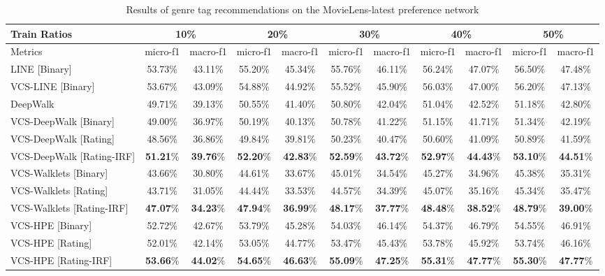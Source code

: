 {\begin{table*}%
\centering
\begin{tabular}{lcccccccccc}
\toprule
Train Ratios & \multicolumn{2}{c}{10\%} & \multicolumn{2}{c}{20\%} & \multicolumn{2}{c}{30\%} & \multicolumn{2}{c}{40\%} & \multicolumn{2}{c}{50\%} \\
\midrule
Metrics & {\small micro-f1} & {\small macro-f1} & {\small micro-f1} & {\small macro-f1} & {\small micro-f1} & {\small macro-f1} & {\small micro-f1} & {\small macro-f1} & {\small micro-f1} & {\small macro-f1}\\
\midrule
LINE \cite{line} [Binary]   & 53.73\% & 43.11\% & 55.20\% & 45.34\% & 55.76\% & 46.11\% & 56.24\% & 47.07\% & 56.50\% & 47.48\% \\
VCS-LINE [Binary]           & 53.67\% & 43.09\% & 54.88\% & 44.92\% & 55.52\% & 45.90\% & 56.03\% & 47.00\% & 56.20\% & 47.13\% \\
\midrule
DeepWalk \cite{dw}          & 49.71\% & 39.13\% & 50.55\% & 41.40\% & 50.80\% & 42.04\% & 51.04\% & 42.52\% & 51.18\% & 42.80\% \\
VCS-DeepWalk [Binary]       & 49.00\% & 36.97\% & 50.19\% & 40.13\% & 50.78\% & 41.22\% & 51.15\% & 41.71\% & 51.34\% & 42.19\% \\
VCS-DeepWalk [Rating]       & 48.56\% & 36.86\% & 49.84\% & 39.81\% & 50.23\% & 40.47\% & 50.60\% & 41.09\% & 50.89\% & 41.59\% \\
VCS-DeepWalk [Rating-IRF]   & \textbf{51.21}\% & \textbf{39.76}\% & \textbf{52.20}\% & \textbf{42.83}\% & \textbf{52.59}\% & \textbf{43.72}\% & \textbf{52.97}\% & \textbf{44.43}\% & \textbf{53.10}\% & \textbf{44.51}\% \\
\midrule
VCS-Walklets [Binary]       & 43.66\% & 30.80\% & 44.61\% & 33.67\% & 45.01\% & 34.54\% & 45.27\% & 34.96\% & 45.38\% & 35.31\% \\
VCS-Walklets [Rating]       & 43.71\% & 31.05\% & 44.44\% & 33.53\% & 44.57\% & 34.39\% & 45.07\% & 35.16\% & 45.34\% & 35.47\% \\
VCS-Walklets [Rating-IRF]   & \textbf{47.07}\% & \textbf{34.23}\% & \textbf{47.94}\% & \textbf{36.99}\% & \textbf{48.17}\% & \textbf{37.77}\% & \textbf{48.48}\% & \textbf{38.52}\% & \textbf{48.79}\% & \textbf{39.00}\% \\
\midrule
VCS-HPE [Binary]        & 52.72\% & 42.67\% & 53.79\% & 45.28\% & 54.03\% & 46.14\% & 54.37\% & 46.79\% & 54.55\% & 46.91\% \\
VCS-HPE [Rating]        & 52.01\% & 42.14\% & 53.05\% & 44.77\% & 53.47\% & 45.43\% & 53.78\% & 45.92\% & 53.74\% & 46.16\% \\
VCS-HPE [Rating-IRF]    & \textbf{53.66}\% & \textbf{44.02}\% & \textbf{54.65}\% & \textbf{46.63}\% & \textbf{55.09}\% & \textbf{47.25}\% & \textbf{55.31}\% & \textbf{47.77}\% & \textbf{55.30}\% & \textbf{47.77}\% \\
\bottomrule
\end{tabular}
\caption{Results of genre tag recommendations on the MovieLens-latest preference network}
\label{tb:ml-latest_tag}
\end{table*}%
}

